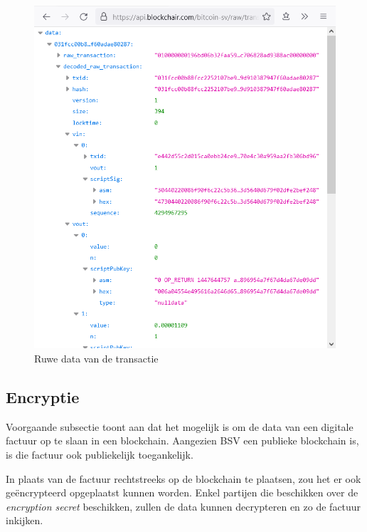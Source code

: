 \begin{figure}[H]
	\centering
	\includegraphics[width=0.8\linewidth]{img/proof-of-concept/ruwe-transactie.png}
	\caption{\label{fig:factuur-transactie}Ruwe data van de transactie}
\end{figure}

\subsection{Encryptie}
\label{sub:encryptie}

Voorgaande subsectie toont aan dat het mogelijk is om de data van een digitale factuur op te slaan in een blockchain. Aangezien BSV een publieke blockchain is, is die factuur ook publiekelijk toegankelijk.

In plaats van de factuur rechtstreeks op de blockchain te plaatsen, zou het er ook geëncrypteerd opgeplaatst kunnen worden. Enkel partijen die beschikken over de \textit{encryption secret} beschikken, zullen de data kunnen decrypteren en zo de factuur inkijken. 

